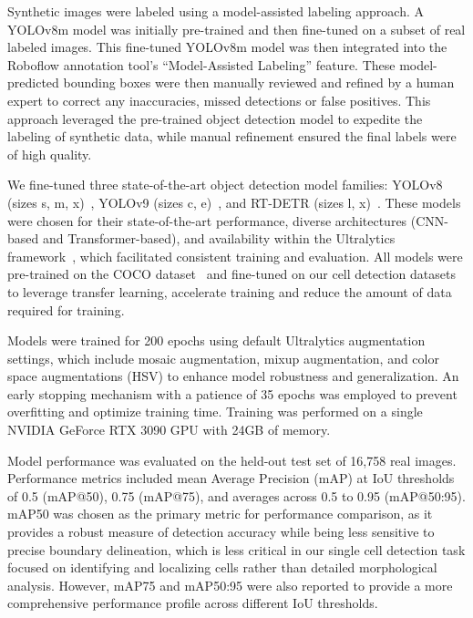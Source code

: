 Synthetic images were labeled using a model-assisted labeling approach.
A YOLOv8m model was initially pre-trained and then fine-tuned on a subset of real labeled images.
This fine-tuned YOLOv8m model was then integrated into the Roboflow annotation tool's ``Model-Assisted Labeling'' feature.
These model-predicted bounding boxes were then manually reviewed and refined by a human expert to correct any inaccuracies, missed detections or false positives.
This approach leveraged the pre-trained object detection model to expedite the labeling of synthetic data, while manual refinement ensured the final labels were of high quality.

We fine-tuned three state-of-the-art object detection model families: YOLOv8 (sizes s, m, x)~\cite{jocher_ultralytics_2023}, YOLOv9 (sizes c, e)~\cite{Wang2024YOLOv9LW}, and RT-DETR (sizes l, x)~\cite{Lv2023DETRsBY}.
These models were chosen for their state-of-the-art performance, diverse architectures (CNN-based and Transformer-based), and availability within the Ultralytics framework~\cite{jocher_ultralytics_2023}, which facilitated consistent training and evaluation.
All models were pre-trained on the COCO dataset~\cite{tsung-yi_lin_microsoft_2014} and fine-tuned on our cell detection datasets to leverage transfer learning, accelerate training and reduce the amount of data required for training.

Models were trained for 200 epochs using default Ultralytics augmentation settings, which include mosaic augmentation, mixup augmentation, and color space augmentations (HSV) to enhance model robustness and generalization.
An early stopping mechanism with a patience of 35 epochs was employed to prevent overfitting and optimize training time.
Training was performed on a single NVIDIA GeForce RTX 3090 GPU with 24GB of memory.

Model performance was evaluated on the held-out test set of 16,758 real images.
Performance metrics included mean Average Precision (mAP) at IoU thresholds of 0.5 (mAP@50), 0.75 (mAP@75), and averages across 0.5 to 0.95 (mAP@50:95).
mAP\@50 was chosen as the primary metric for performance comparison, as it provides a robust measure of detection accuracy while being less sensitive to precise boundary delineation, which is less critical in our single cell detection task focused on identifying and localizing cells rather than detailed morphological analysis.
However, mAP\@75 and mAP\@50:95 were also reported to provide a more comprehensive performance profile across different IoU thresholds.

